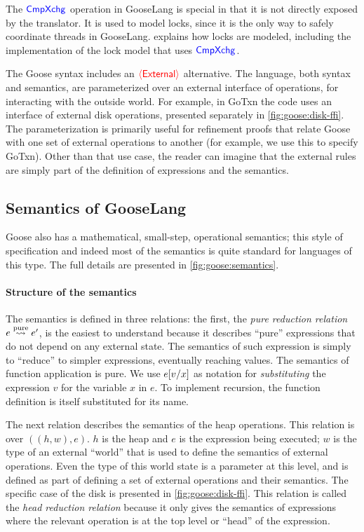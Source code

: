 The $\goosekw{CmpXchg}$ operation in GooseLang is special in that it is not
directly exposed by the translator. It is used to model locks, since it is the
only way to safely coordinate threads in GooseLang. 
explains how locks are modeled, including the implementation of the lock model
that uses $\goosekw{CmpXchg}$.

The Goose syntax includes an $\external$ alternative. The language, both syntax
and semantics, are parameterized over an external interface of operations, for
interacting with the outside world. For example, in GoTxn the code uses an
interface of external disk operations, presented separately in
\cref{fig:goose:disk-ffi}. The parameterization is primarily useful for
refinement proofs that relate Goose with one set of external operations to
another (for example, we use this to specify GoTxn). Other than that use case,
the reader can imagine that the external rules are simply part of the definition
of expressions and the semantics.

\subsection{Semantics of GooseLang}%
\label{sec:goose:semantics}

Goose also has a mathematical, small-step, operational semantics; this style of
specification and indeed most of the semantics is quite standard for languages of
this type. The full details are presented in \cref{fig:goose:semantics}.



\paragraph{Structure of the semantics}
The semantics is defined in three relations: the first, the
\emph{pure reduction relation} $e \purereduction e'$, is the easiest to understand
because it describes ``pure'' expressions that do not depend on any external
state. The semantics of such expression is simply to ``reduce'' to simpler
expressions, eventually reaching values. The semantics of function application
is pure. We use $\subst{e}{x}{v}$ as notation for \emph{substituting} the expression
$v$ for the variable $x$ in $e$. To implement recursion, the function definition
is itself substituted for its name.

The next relation describes the semantics of the heap operations. This relation is over
$((h, w), e)$. $h$ is the heap and $e$ is the expression being executed; $w$ is
the type of an external ``world'' that is used to define the semantics of
external operations. Even the type of this world state is a parameter at this
level, and is defined as part of defining a set of external operations and their
semantics. The specific case of the disk is presented in
\cref{fig:goose:disk-ffi}. This
relation is called the \emph{head reduction
relation} because it only gives the semantics of expressions where the
relevant operation is at the top level or ``head'' of the expression.

